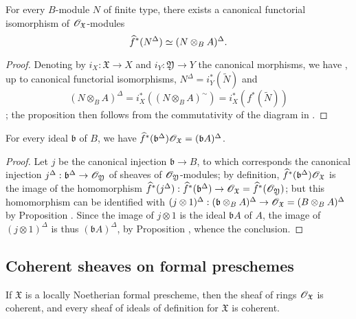 \begin{proposition}[10.10.8]
\label{I.10.10.8}
For every $B$-module $N$ of finite type, there exists a canonical functorial isomorphism of $\mathscr{O}_\mathfrak{X}$-modules
\[
  \widehat{f}^*(N^\Delta)\simeq(N\otimes_B A)^\Delta.
\]
\end{proposition}

\begin{proof}
Denoting by $i_X:\mathfrak{X}\to X$ and $i_Y:\mathfrak{Y}\to Y$ the canonical morphisms, we have , up to canonical functorial isomorphisms, $N^\Delta=i_Y^*(\widetilde{N})$ and
\[
  (N\otimes_B A)^\Delta=i_X^*((N\otimes_B A)^\sim)=i_X^*(f^*(\widetilde{N}))
\]
; the proposition then follows from the commutativity of the diagram in .
\end{proof}

\begin{corollary}
\label{I.10.10.9}
For every ideal $\mathfrak{b}$ of $B$, we have $\widehat{f}^*(\mathfrak{b}^\Delta)\mathscr{O}_\mathfrak{X}=(\mathfrak{b}A)^\Delta$.
\end{corollary}

\begin{proof}
Let $j$ be the canonical injection $\mathfrak{b}\to B$, to which corresponds the canonical injection $j^\Delta:\mathfrak{b}^\Delta\to\sh{O}_\mathfrak{Y}$ of sheaves of $\mathscr{O}_\mathfrak{Y}$-modules; by definition, $\widehat{f}^*(\mathfrak{b}^\Delta)\mathscr{O}_\mathfrak{X}$ is the image of the homomorphism $\widehat{f}^*(j^\Delta):\widehat{f}^*(\mathfrak{b}^\Delta)\to\sh{O}_\mathfrak{X}=\widehat{f}^*(\sh{O}_\mathfrak{Y})$; but this homomorphism can be identified with $(j\otimes 1)^\Delta:(\mathfrak{b}\otimes_B A)^\Delta\to\sh{O}_\mathfrak{X}=(B\otimes_B A)^\Delta$ by Proposition .
Since the image of $j\otimes 1$ is the ideal $\mathfrak{b}A$ of $A$, the image of $(j\otimes 1)^\Delta$ is thus $(\mathfrak{b}A)^\Delta$, by Proposition , whence the conclusion.
\end{proof}

\subsection{Coherent sheaves on formal preschemes}
\label{subsection:I.10.11}

\begin{proposition}[10.11.1]
\label{I.10.11.1}
If $\mathfrak{X}$ is a locally Noetherian formal prescheme, then the sheaf of rings $\mathscr{O}_\mathfrak{X}$ is coherent, and every sheaf of ideals of definition for $\mathfrak{X}$ is coherent.
\end{proposition}

